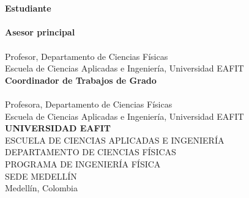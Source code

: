 \begin{titlepage}
\thispagestyle{empty}
\centering
\singlespacing
\vspace*{1.5cm}

{\normalsize\bfseries \docTipo}\\[1.8cm]

{\large\bfseries \docTitulo}\\[2.4cm]

{\normalsize\bfseries Estudiante}\\[0.15cm]
{\normalsize \docAutor}\\[1.2cm]

{\normalsize\bfseries Asesor principal}\\[0.15cm]
{\normalsize \docAsesor}\\
{\footnotesize Profesor, Departamento de Ciencias Físicas}\\
{\footnotesize Escuela de Ciencias Aplicadas e Ingeniería, Universidad EAFIT}\\[1.0cm]

{\normalsize\bfseries Coordinador de Trabajos de Grado}\\[0.15cm]
{\normalsize \docCoordinador}\\
{\footnotesize Profesora, Departamento de Ciencias Físicas}\\
{\footnotesize Escuela de Ciencias Aplicadas e Ingeniería, Universidad EAFIT}\\[2.0cm]

{\large\bfseries UNIVERSIDAD EAFIT}\\[0.2cm]
{\normalsize ESCUELA DE CIENCIAS APLICADAS E INGENIERÍA}\\[0.15cm]
{\normalsize DEPARTAMENTO DE CIENCIAS FÍSICAS}\\[0.15cm]
{\normalsize PROGRAMA DE INGENIERÍA FÍSICA}\\[0.15cm]
{\normalsize SEDE MEDELLÍN}\\[1.6cm]

{\normalsize Medellín, Colombia}\\
{\normalsize \docFecha}

\end{titlepage}
